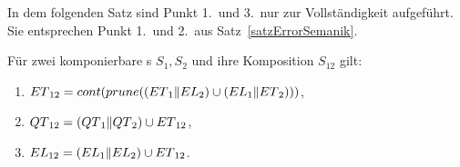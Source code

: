 In dem folgenden Satz sind Punkt 1.\ und 3.\ nur zur Vollständigkeit aufgeführt.
Sie entsprechen Punkt 1.\ und 2.\ aus Satz~\ref{satzErrorSemanik}.

\begin{satz}
\label{satzQuiSemantik}
  Für zwei komponierbare \EIO{}s $S_1, S_2$ und ihre Komposition $S_{12}$ gilt:
  \begin{enumerate}
    \item $ET{}_{12} = cont{}(prune{}((ET{}_1\|EL{}_2)\cup
      (EL{}_1\|ET{}_2)))$,
    \item $QT{}_{12} = (QT{}_1\|QT{}_2)\cup ET{}_{12}$,
    \item $EL{}_{12} = (EL{}_1\|EL{}_2)\cup ET{}_{12}$.
  \end{enumerate}
\end{satz}

